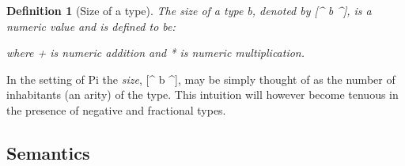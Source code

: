 \documentclass[preprint]{sigplanconf}
\newtheorem{definition}[theorem]{Definition}
\newtheorem{proposition}[theorem]{Proposition}
\begin{document}
\begin{definition}[Size of a type]
\label{def:size}
The size of a type {{b}}, denoted by {{[^ b ^]}}, is a numeric value
and is defined to be:
\vspace{-20pt}
\begin{multicols}{2}

\end{multicols}
where {{+}} is numeric addition and {{*}} is numeric multiplication. 
  
\end{definition}
\noindent
In the setting of {{Pi}} the \emph{size}, {{[^ b ^]}}, may be simply thought of
as the number of inhabitants (an arity) of the type. This intuition will
however become tenuous in the presence of negative and fractional
types.


\subsection{Semantics}
\end{document}
